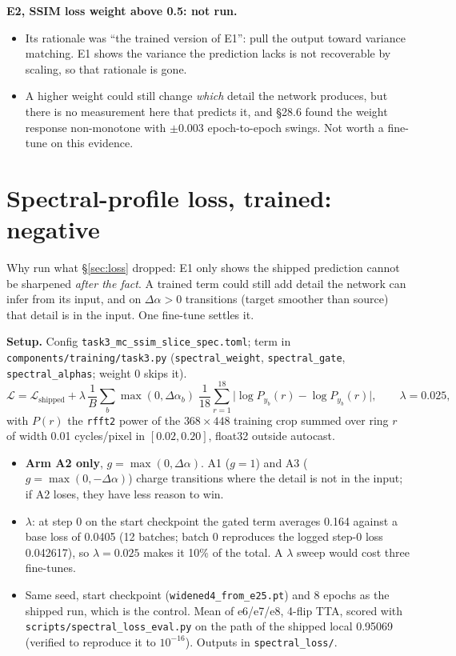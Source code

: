 \documentclass[10pt,a4paper]{article}
\newcommand{\da}{\Delta\alpha}
\begin{document}
\textbf{E2, SSIM loss weight above 0.5: not run.}
\begin{itemize}
  \item Its rationale was ``the trained version of E1'': pull the output toward variance
        matching. E1 shows the variance the prediction lacks is not recoverable by scaling, so
        that rationale is gone.
  \item A higher weight could still change \emph{which} detail the network produces, but there
        is no measurement here that predicts it, and \S28.6 found the weight response
        non-monotone with $\pm0.003$ epoch-to-epoch swings. Not worth a fine-tune on this
        evidence.
\end{itemize}

\section{Spectral-profile loss, trained: negative}\label{sec:losstest}

Why run what \S\ref{sec:loss} dropped: E1 only shows the shipped prediction cannot be
sharpened \emph{after the fact}. A trained term could still add detail the network can infer
from its input, and on $\da > 0$ transitions (target smoother than source) that detail is in
the input. One fine-tune settles it.

\textbf{Setup.} Config \texttt{task3\_mc\_ssim\_slice\_spec.toml}; term in
\texttt{components/training/task3.py} (\texttt{spectral\_weight}, \texttt{spectral\_gate},
\texttt{spectral\_alphas}; weight 0 skips it).
\[
  \mathcal{L} = \mathcal{L}_{\text{shipped}}
  + \lambda\, \frac{1}{B}\sum_{b} \max(0, \da_b)\; \frac{1}{18}\sum_{r=1}^{18}
    \bigl|\log P_{\hat y_b}(r) - \log P_{y_b}(r)\bigr|,
  \qquad \lambda = 0.025,
\]
with $P(r)$ the \texttt{rfft2} power of the $368\times448$ training crop summed over ring $r$ of
width 0.01 cycles/pixel in $[0.02, 0.20]$, float32 outside autocast.
\begin{itemize}
  \item \textbf{Arm A2 only}, $g = \max(0,\da)$. A1 ($g = 1$) and A3 ($g = \max(0,-\da)$) charge
        transitions where the detail is not in the input; if A2 loses, they have less reason to
        win.
  \item \textbf{$\lambda$}: at step 0 on the start checkpoint the gated term averages 0.164
        against a base loss of 0.0405 (12 batches; batch 0 reproduces the logged step-0 loss
        0.042617), so $\lambda = 0.025$ makes it 10\% of the total. A $\lambda$ sweep would
        cost three fine-tunes.
  \item Same seed, start checkpoint (\texttt{widened4\_from\_e25.pt}) and 8 epochs as the
        shipped run, which is the control. Mean of e6/e7/e8, 4-flip TTA, scored with
        \texttt{scripts/spectral\_loss\_eval.py} on the path of the shipped local 0.95069
        (verified to reproduce it to $10^{-16}$). Outputs in \texttt{spectral\_loss/}.
\end{itemize}
\end{document}
